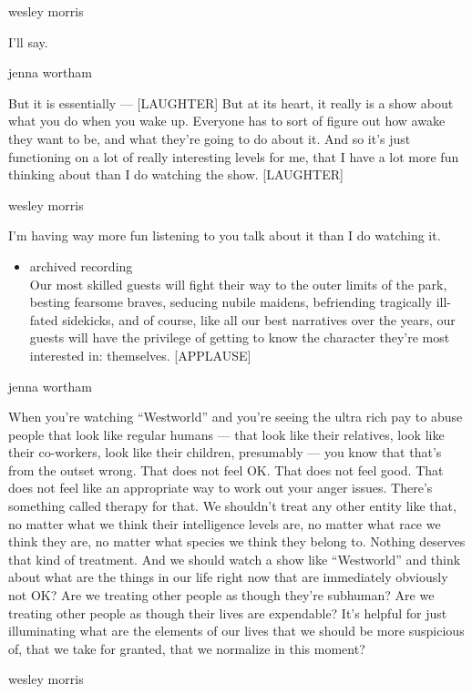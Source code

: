wesley morris

I'll say.

jenna wortham

But it is essentially --- {[}LAUGHTER{]} But at its heart, it really is
a show about what you do when you wake up. Everyone has to sort of
figure out how awake they want to be, and what they're going to do about
it. And so it's just functioning on a lot of really interesting levels
for me, that I have a lot more fun thinking about than I do watching the
show. {[}LAUGHTER{]}

wesley morris

I'm having way more fun listening to you talk about it than I do
watching it.

\begin{itemize}
\tightlist
\item
  archived recording\\
  Our most skilled guests will fight their way to the outer limits of
  the park, besting fearsome braves, seducing nubile maidens,
  befriending tragically ill-fated sidekicks, and of course, like all
  our best narratives over the years, our guests will have the privilege
  of getting to know the character they're most interested in:
  themselves. {[}APPLAUSE{]}
\end{itemize}

jenna wortham

When you're watching ``Westworld'' and you're seeing the ultra rich pay
to abuse people that look like regular humans --- that look like their
relatives, look like their co-workers, look like their children,
presumably --- you know that that's from the outset wrong. That does not
feel OK. That does not feel good. That does not feel like an appropriate
way to work out your anger issues. There's something called therapy for
that. We shouldn't treat any other entity like that, no matter what we
think their intelligence levels are, no matter what race we think they
are, no matter what species we think they belong to. Nothing deserves
that kind of treatment. And we should watch a show like ``Westworld''
and think about what are the things in our life right now that are
immediately obviously not OK? Are we treating other people as though
they're subhuman? Are we treating other people as though their lives are
expendable? It's helpful for just illuminating what are the elements of
our lives that we should be more suspicious of, that we take for
granted, that we normalize in this moment?

wesley morris

